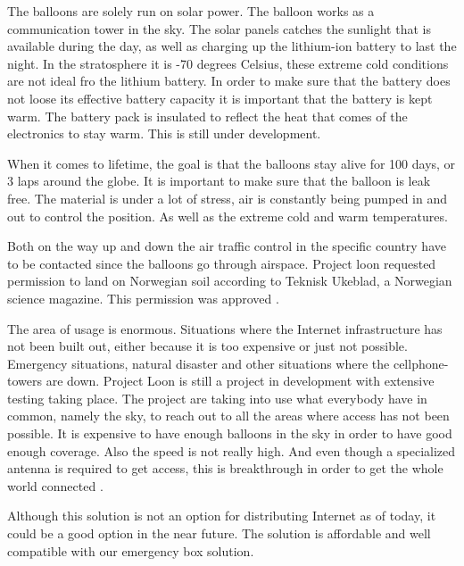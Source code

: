 The balloons are solely run on solar power. The balloon works as a communication tower in the sky. The solar panels catches the sunlight that is available during the day, as well as charging up the lithium-ion battery to last the night. In the stratosphere it is -70 degrees Celsius, these extreme cold conditions are not ideal fro the lithium battery. In order to make sure that the battery does not loose its effective battery capacity it is important that the battery is kept warm. The battery pack is insulated to reflect the heat that comes of the electronics to stay warm. This is still under development. 

When it comes to lifetime, the goal is that the balloons stay alive for 100 days, or 3 laps around the globe. It is important to make sure that the balloon is leak free. The material is under a lot of stress, air is constantly being pumped in and out to control the position. As well as the extreme cold and warm temperatures. 

Both on the way up and down the air traffic control in the specific country have to be contacted since the balloons go through airspace. Project loon requested permission to land on Norwegian soil according to Teknisk Ukeblad, a Norwegian science magazine. This permission was approved \cite{loonTU}.

The area of usage is enormous. Situations where the Internet infrastructure has not been built out, either because it is too expensive or just not possible. Emergency situations, natural disaster and other situations where the cellphone-towers are down. Project Loon is still a project in development with extensive testing taking place. The project are taking into use what everybody have in common, namely the sky, to reach out to all the areas where access has not been possible. It is expensive to have enough balloons in the sky in order to have good enough coverage. Also the speed is not really high. And even though a specialized antenna is required to get access, this is breakthrough in order to get the whole world connected \cite{loonYouTube, loonNorsk}.

Although this solution is not an option for distributing Internet as of today, it could be a good option in the near future. The solution is affordable and well compatible with our emergency box solution.

